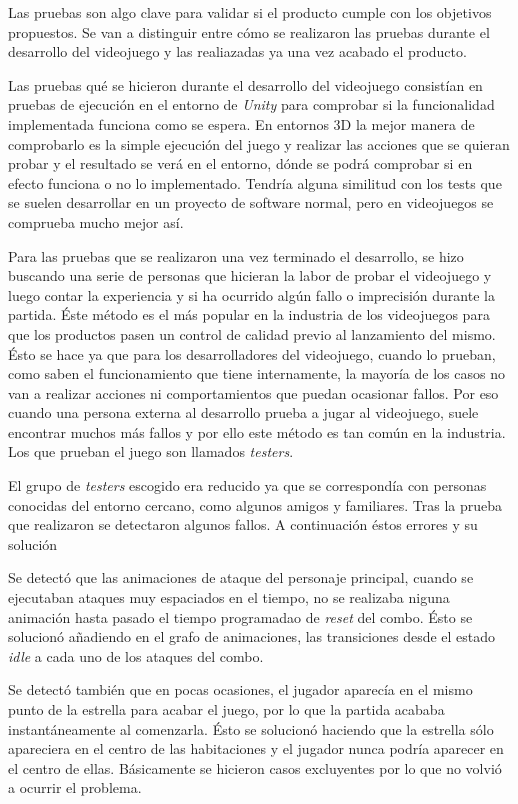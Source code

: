 Las pruebas son algo clave para validar si el producto cumple con los objetivos propuestos. Se van a distinguir entre cómo se realizaron las pruebas durante el desarrollo del videojuego y las realiazadas ya una vez acabado el producto.

Las pruebas qué se hicieron durante el desarrollo del videojuego consistían en pruebas de ejecución en el entorno de \textit{Unity} para comprobar si la funcionalidad implementada funciona como se espera. En entornos 3D la mejor manera de comprobarlo es la simple ejecución del juego y realizar las acciones que se quieran probar y el resultado se verá en el entorno, dónde se podrá comprobar si en efecto funciona o no lo implementado. Tendría alguna similitud con los tests que se suelen desarrollar en un proyecto de software normal, pero en videojuegos se comprueba mucho mejor así. 

Para las pruebas que se realizaron una vez terminado el desarrollo, se hizo buscando una serie de personas que hicieran la labor de probar el videojuego y luego contar la experiencia y si ha ocurrido algún fallo o imprecisión durante la partida. Éste método es el más popular en la industria de los videojuegos para que los productos pasen un control de calidad previo al lanzamiento del mismo. Ésto se hace ya que para los desarrolladores del videojuego, cuando lo prueban, como saben el funcionamiento que tiene internamente, la mayoría de los casos no van a realizar acciones ni comportamientos que puedan ocasionar fallos. Por eso cuando una persona externa al desarrollo prueba a jugar al videojuego, suele encontrar muchos más fallos y por ello este método es tan común en la industria. Los que prueban el juego son llamados \textit{testers}.

El grupo de \textit{testers} escogido era reducido ya que se correspondía con personas conocidas del entorno cercano, como algunos amigos y familiares. Tras la prueba que realizaron se detectaron algunos fallos. A continuación éstos errores y su solución

Se detectó que las animaciones de ataque del personaje principal, cuando se ejecutaban ataques muy espaciados en el tiempo, no se realizaba niguna animación hasta pasado el tiempo programadao de \textit{reset} del combo. Ésto se solucionó añadiendo en el grafo de animaciones, las transiciones desde el estado \textit{idle} a cada uno de los ataques del combo.

Se detectó también que en pocas ocasiones, el jugador aparecía en el mismo punto de la estrella para acabar el juego, por lo que la partida acababa instantáneamente al comenzarla. Ésto se solucionó haciendo que la estrella sólo apareciera en el centro de las habitaciones y el jugador nunca podría aparecer en el centro de ellas. Básicamente se hicieron casos excluyentes por lo que no volvió a ocurrir el problema.

